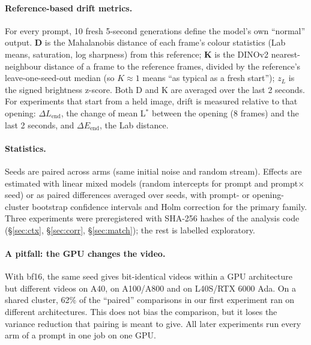 \documentclass[11pt]{article}
\newcommand{\Lstar}{L$^{*}$}
\begin{document}
\paragraph{Reference-based drift metrics.} For every prompt, 10 fresh 5-second generations define the model's own
``normal'' output. \textbf{D} is the Mahalanobis distance of each frame's colour statistics (Lab means, saturation,
log sharpness) from this reference; \textbf{K} is the DINOv2 nearest-neighbour distance of a frame to the reference
frames, divided by the reference's leave-one-seed-out median (so $K\approx1$ means ``as typical as a fresh start'');
$z_L$ is the signed brightness z-score. Both D and K are averaged over the last 2 seconds. For experiments that start
from a held image, drift is measured relative to that opening: $\Delta L_\text{end}$, the change of mean \Lstar{}
between the opening (8 frames) and the last 2 seconds, and $\Delta E_\text{end}$, the Lab distance.

\paragraph{Statistics.} Seeds are paired across arms (same initial noise and random stream). Effects are estimated
with linear mixed models (random intercepts for prompt and prompt$\times$seed) or as paired differences averaged over
seeds, with prompt- or opening-cluster bootstrap confidence intervals and Holm correction for the primary family.
Three experiments were preregistered with SHA-256 hashes of the analysis code (\S\ref{sec:ctx}, \S\ref{sec:corr},
\S\ref{sec:match}); the rest is labelled exploratory.

\paragraph{A pitfall: the GPU changes the video.} With bf16, the same seed gives bit-identical videos within a GPU
architecture but different videos on A40, on A100/A800 and on L40S/RTX 6000 Ada. On a shared cluster, 62\% of the
``paired'' comparisons in our first experiment ran on different architectures. This does not bias the comparison, but
it loses the variance reduction that pairing is meant to give. All later experiments run every arm of a prompt in one
job on one GPU.
\end{document}
